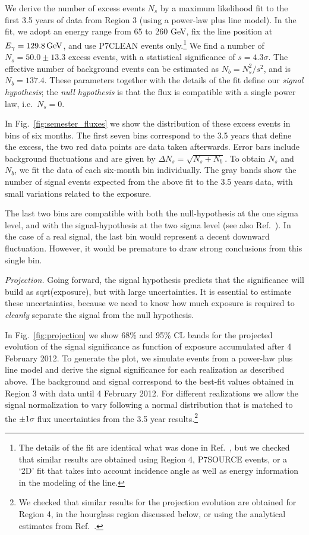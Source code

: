 \documentclass[aps,prd,superscriptaddress,nofootinbib,fixlfloat, 12pt]{revtex4-1}
\begin{document}
We derive the number of excess events $N_s$ by a maximum likelihood fit to the
first 3.5 years of data from Region 3 (using a power-law plus line model). In
the fit, we adopt an energy range from 65 to 260 GeV, fix the line position at
$E_\gamma=129.8\rm\,GeV$, and use P7CLEAN events only.\footnote{The details of
the fit are identical what was done in Ref.~\cite{Weniger:2012}, but we
checked that similar results are obtained using Region 4, P7SOURCE events,
or a `2D' fit that takes into account incidence angle as well as energy
information in the modeling of the line.} We find a number of $N_s=50.0\pm 13.3$
excess events, with a
statistical significance of $s=4.3\sigma$. The effective number
of background events can be estimated as $N_b = N_s^2/s^2$, and is $N_b=137.4$.
These parameters together with the details of the fit define our \emph{signal
hypothesis}; the \emph{null hypothesis} is that the flux is compatible with a
single power law, i.e.~$N_s=0$.

In Fig.~\ref{fig:semester_fluxes} we show the distribution of these excess events in bins of six
months. The first seven bins correspond to the 3.5 years that define the
excess, the two red data points are data taken afterwards. Error bars include
background fluctuations and are given by $\Delta N_s = \sqrt{N_s+N_b}$. To
obtain $N_s$ and $N_b$, we fit the data of each six-month bin
individually. The gray bands show the number of signal events expected from
the above fit to the 3.5 years data, with small variations related to
the exposure.

The last two bins are compatible with both the null-hypothesis at the one
sigma level, and with the signal-hypothesis at the two sigma level (see also
Ref.~\cite{Weniger:2013dya}). In the case of a real signal, the last bin would
represent a decent downward fluctuation. However, it would be premature to
draw strong conclusions from this single bin.

\emph{Projection.} 
Going forward, the signal hypothesis predicts that the significance will build
as sqrt(exposure), but with large uncertainties.  It is essential to estimate
these uncertainties, because we need to know how much exposure is required to
\emph{cleanly} separate the signal from the null hypothesis. 

In Fig.~\ref{fig:projection} we show 68\% and 95\% CL bands for the projected evolution of the
signal significance as function of exposure accumulated after 4 February 2012.
To generate the plot, we simulate events from a power-law plus line model and
derive the signal significance for each realization as described above. The
background and signal correspond to the best-fit values obtained in Region 3
with data until 4 February 2012.  For different realizations we allow the
signal normalization to vary following a normal distribution that is matched
to the $\pm1\sigma$ flux uncertainties from the 3.5 year results.\footnote{We
checked that similar results for the projection evolution are obtained for
Region 4, in the hourglass region discussed below, or using the analytical
estimates from Ref.~\cite{Weniger:2013dya}.}
\end{document}
